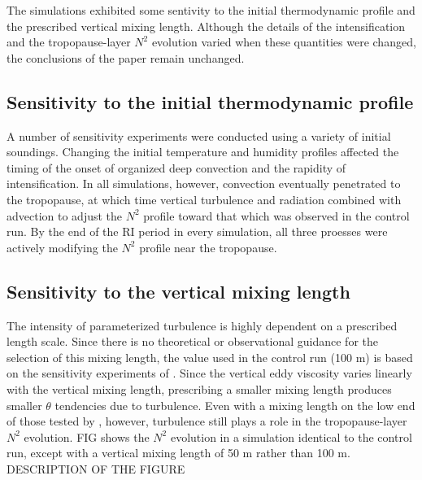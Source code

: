 \documentclass{ametsoc}
\begin{document}
%
\appendix


The simulations exhibited some sentivity to the initial thermodynamic profile and the prescribed vertical mixing length.
Although the details of the intensification and the tropopause-layer $N^2$ evolution varied when these quantities were changed, the conclusions of the paper remain unchanged.

 \subsection{Sensitivity to the initial thermodynamic profile}
A number of sensitivity experiments were conducted using a variety of initial soundings.
Changing the initial temperature and humidity profiles affected the timing of the onset of organized deep convection and the rapidity of intensification.
In all simulations, however, convection eventually penetrated to the tropopause, at which time vertical turbulence and radiation combined with advection to adjust the $N^2$ profile toward that which was observed in the control run.
By the end of the RI period in every simulation, all three proesses were actively modifying the $N^2$ profile near the tropopause.

 \subsection{Sensitivity to the vertical mixing length}
The intensity of parameterized turbulence is highly dependent on a prescribed length scale.
Since there is no theoretical or observational guidance for the selection of this mixing length, the value used in the control run (100 m) is based on the sensitivity experiments of \cite{Bryan2012}.
Since the vertical eddy viscosity varies linearly with the vertical mixing length, prescribing a smaller mixing length produces smaller $\theta$ tendencies due to turbulence.
Even with a mixing length on the low end of those tested by \cite{Bryan2012}, however, turbulence still plays a role in the tropopause-layer $N^2$ evolution.
FIG shows the $N^2$ evolution in a simulation identical to the control run, except with a vertical mixing length of 50 m rather than 100 m.
DESCRIPTION OF THE FIGURE
\end{document}
